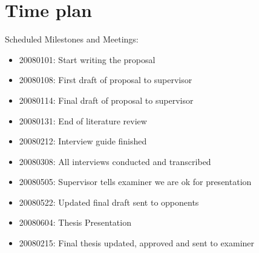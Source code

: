 \documentclass[10pt,a4paper]{proposal}
\begin{document}
\section*{Time plan}
Scheduled Milestones and Meetings:
\begin{itemize}
\item 20080101: Start writing the proposal
\item 20080108: First draft of proposal to supervisor
\item 20080114: Final draft of proposal to supervisor
\item 20080131: End of literature review
\item 20080212: Interview guide finished
\item 20080308: All interviews conducted and transcribed
\item 20080505: Supervisor tells examiner we are ok for presentation
\item 20080522: Updated final draft sent to opponents
\item 20080604: Thesis Presentation
\item 20080215: Final thesis updated, approved and sent to examiner
\end{itemize}

\footnotesize


 
 
\end{document}
